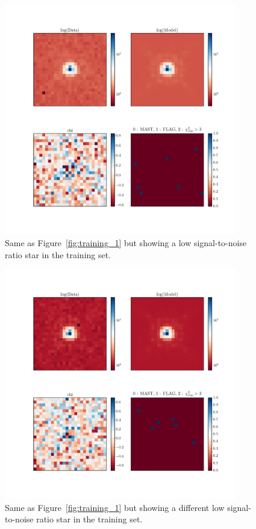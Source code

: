 \begin{figure}
\includegraphics[width=0.9\textwidth , height=0.9\textwidth ]{figures/wfc3ir/training3.pdf}
\caption{\label{fig:training_3} Same as Figure~\ref{fig:training_1} but showing a low signal-to-noise ratio star in the training set.}
\end{figure}

\begin{figure}
\includegraphics[width=0.9\textwidth , height=0.9\textwidth ]{figures/wfc3ir/training4.pdf}
\caption{\label{fig:training_4} Same as Figure~\ref{fig:training_1} but showing a different low signal-to-noise ratio star in the training set.}
\end{figure}

